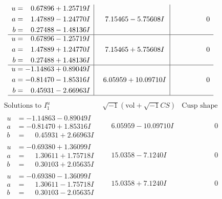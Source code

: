 \documentclass[1p]{elsarticle_modified}
\theoremstyle{definition}
\newcommand{\I}{\sqrt{-1}}
\begin{document}
$$\begin{array}{c|c|c}
\begin{aligned}
u &= \phantom{-}0.67896 + 1.25719 I \\
a &= \phantom{-}1.47889 - 1.24770 I \\
b &= \phantom{-}0.27488 - 1.48136 I\end{aligned}
 & \phantom{-}7.15465 - 5.75608 I & \phantom{-0.000000 } 0 \\ \hline\begin{aligned}
u &= \phantom{-}0.67896 - 1.25719 I \\
a &= \phantom{-}1.47889 + 1.24770 I \\
b &= \phantom{-}0.27488 + 1.48136 I\end{aligned}
 & \phantom{-}7.15465 + 5.75608 I & \phantom{-0.000000 } 0 \\ \hline\begin{aligned}
u &= -1.14863 + 0.89049 I \\
a &= -0.81470 - 1.85316 I \\
b &= \phantom{-}0.45931 - 2.66963 I\end{aligned}
 & \phantom{-}6.05959 + 10.09710 I & \phantom{-0.000000 } 0\\
 \hline 
 \end{array}$$\newpage$$\begin{array}{c|c|c}  
\text{Solutions to }I^u_{1}& \I (\text{vol} + \sqrt{-1}CS) & \text{Cusp shape}\\
 \hline 
\begin{aligned}
u &= -1.14863 - 0.89049 I \\
a &= -0.81470 + 1.85316 I \\
b &= \phantom{-}0.45931 + 2.66963 I\end{aligned}
 & \phantom{-}6.05959 - 10.09710 I & \phantom{-0.000000 } 0 \\ \hline\begin{aligned}
u &= -0.69380 + 1.36099 I \\
a &= \phantom{-}1.30611 + 1.75718 I \\
b &= \phantom{-}0.30103 + 2.05635 I\end{aligned}
 & \phantom{-}15.0358 - 7.1240 I & \phantom{-0.000000 } 0 \\ \hline\begin{aligned}
u &= -0.69380 - 1.36099 I \\
a &= \phantom{-}1.30611 - 1.75718 I \\
b &= \phantom{-}0.30103 - 2.05635 I\end{aligned}
 & \phantom{-}15.0358 + 7.1240 I & \phantom{-0.000000 } 0 \\ \hline\begin{aligned}

\end{aligned}
\end{array}$$
\end{document}
